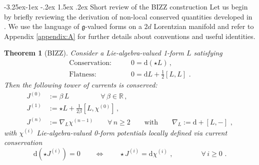 \documentclass[12pt]{article}
\makeatletter
\newtheorem{thm}{Theorem}[section]
\renewcommand\subsection{\@startsection{subsection}{2}{\z@}%
                                     {-3.25ex\@plus -1ex \@minus -.2ex}%
                                     {1.5ex \@plus .2ex}%
                                     {\normalfont\bfseries}}
\numberwithin{equation}{section}
\makeatother
\begin{document}
\subsection{Short review of the BIZZ construction}
Let us begin by briefly reviewing the derivation of non-local conserved quantities developed in \cite{BREZIN1979442}. We use the language of $\mathfrak{g}$-valued forms on a $2d$ Lorentzian manifold and refer to Appendix \ref{appendix:A} for further details about conventions and useful identities.
\begin{thm}[BIZZ]\label{BIZZ-theorem}
Consider a Lie-algebra-valued 1-form $L$ satisfying 
\begin{equation}\label{j-properties-definition}
\begin{aligned}
\text{Conservation:}& \qquad
0=\mathrm{d}(\star L) \, ,
\\
\text{Flatness:}& \qquad 0=\mathrm{d}L+\tfrac{1}{2}[L,L] \,\, .
\end{aligned}
\end{equation}
Then the following tower of currents is conserved:
\begin{equation}\label{original-BIZZ-tower}
\begin{aligned}
J^{(0)}&:=\beta \, L
\quad \quad \quad \quad \,\,\, \forall \, \beta \in \mathbb{R} \, ,
\\
J^{(1)}&:=\star L+\tfrac{1}{2\beta}[L,\chi^{(0)}] \, ,
\\
J^{(n)}&:=\nabla_{L}\chi^{(n-1)} \qquad \forall \, n \geq 2 \qquad \text{with} \qquad \nabla_{L}:=\mathrm{d}+[L,-] \,\, ,
\end{aligned}
\end{equation}
with $\chi^{(i)}$ Lie-algebra-valued 0-form potentials locally defined via current conservation
\begin{equation}\label{BIZZ-potentials}
\mathrm{d}(\star J^{(i)})=0 
\qquad \Longleftrightarrow \qquad
\star J^{(i)}=\mathrm{d}\chi^{(i)} \,\, , 
\qquad \qquad \forall \, i\geq 0
\,\, .
\end{equation}
\end{thm}
\end{document}
